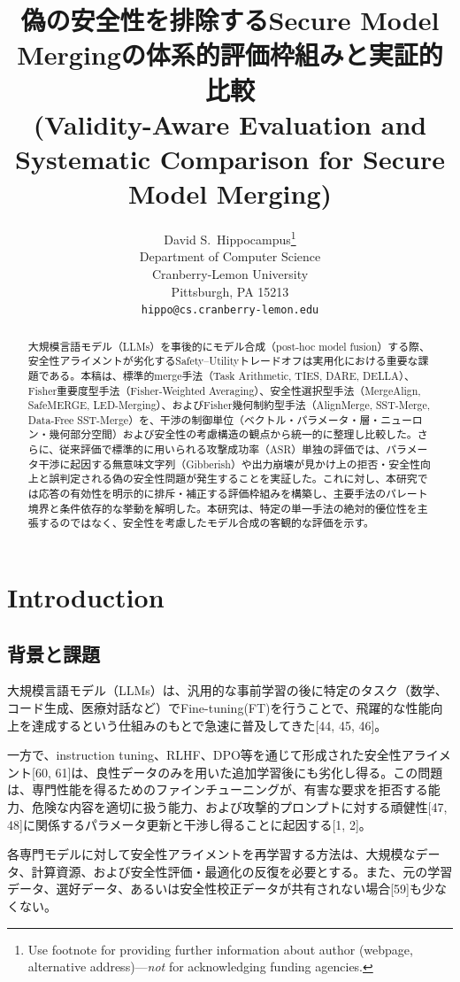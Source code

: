 \documentclass{article}
\title{偽の安全性を排除するSecure Model Mergingの体系的評価枠組みと実証的比較\\(Validity-Aware Evaluation and Systematic Comparison for Secure Model Merging)}
\author{%
  David S.~Hippocampus\thanks{Use footnote for providing further information
    about author (webpage, alternative address)---\emph{not} for acknowledging
    funding agencies.} \\
  Department of Computer Science\\
  Cranberry-Lemon University\\
  Pittsburgh, PA 15213 \\
  \texttt{hippo@cs.cranberry-lemon.edu} \\
}
\begin{document}
\maketitle


\begin{abstract}
大規模言語モデル（LLMs）を事後的にモデル合成（post-hoc model fusion）する際、安全性アライメントが劣化するSafety--Utilityトレードオフは実用化における重要な課題である。本稿は、標準的merge手法（Task Arithmetic, TIES, DARE, DELLA）、Fisher重要度型手法（Fisher-Weighted Averaging）、安全性選択型手法（MergeAlign, SafeMERGE, LED-Merging）、およびFisher幾何制約型手法（AlignMerge, SST-Merge, Data-Free SST-Merge）を、干渉の制御単位（ベクトル・パラメータ・層・ニューロン・幾何部分空間）および安全性の考慮構造の観点から統一的に整理し比較した。さらに、従来評価で標準的に用いられる攻撃成功率（ASR）単独の評価では、パラメータ干渉に起因する無意味文字列（Gibberish）や出力崩壊が見かけ上の拒否・安全性向上と誤判定される偽の安全性問題が発生することを実証した。これに対し、本研究では応答の有効性を明示的に排斥・補正する評価枠組みを構築し、主要手法のパレート境界と条件依存的な挙動を解明した。本研究は、特定の単一手法の絶対的優位性を主張するのではなく、安全性を考慮したモデル合成の客観的な評価を示す。
\end{abstract}

\section{Introduction}
\subsection{背景と課題 }
大規模言語モデル（LLMs）は、汎用的な事前学習の後に特定のタスク（数学、コード生成、医療対話など）でFine-tuning(FT)を行うことで、飛躍的な性能向上を達成するという仕組みのもとで急速に普及してきた[44, 45, 46]。

一方で、instruction tuning、RLHF、DPO等を通じて形成された安全性アライメント[60, 61]は、良性データのみを用いた追加学習後にも劣化し得る。この問題は、専門性能を得るためのファインチューニングが、有害な要求を拒否する能力、危険な内容を適切に扱う能力、および攻撃的プロンプトに対する頑健性[47, 48]に関係するパラメータ更新と干渉し得ることに起因する[1, 2]。

各専門モデルに対して安全性アライメントを再学習する方法は、大規模なデータ、計算資源、および安全性評価・最適化の反復を必要とする。また、元の学習データ、選好データ、あるいは安全性校正データが共有されない場合[59]も少なくない。
\end{document}

